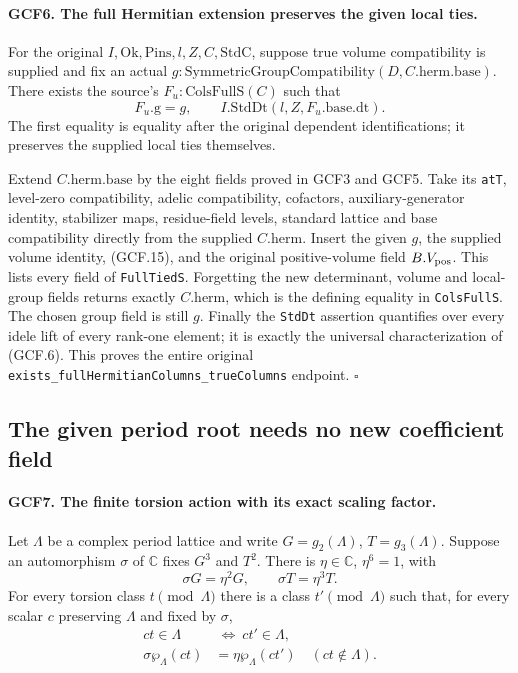 \paragraph{GCF6. The full Hermitian extension preserves the given local ties.}
\label{claim:GCF6}
For the original \(I,\mathrm{Ok},\mathrm{Pins},l,Z,C,\mathrm{StdC}\),
suppose true volume compatibility is supplied and fix an actual
\(g:\mathrm{SymmetricGroupCompatibility}(D,C.\mathrm{herm.base})\).
There exists the source's \(F_u:\mathrm{ColsFullS}(C)\) such that
\[
 F_u.\mathrm{g}=g,\qquad
 I.\mathrm{StdDt}(l,Z,F_u.\mathrm{base.dt}).             \tag{GCF.16}
\]
The first equality is equality after the original dependent
identifications; it preserves the supplied local ties themselves.

Extend \(C.\mathrm{herm.base}\) by the eight fields proved in
GCF3 and GCF5.  Take its \texttt{atT}, level-zero compatibility,
adelic compatibility, cofactors, auxiliary-generator identity,
stabilizer maps, residue-field levels, standard lattice and base
compatibility directly from the supplied \(C.\mathrm{herm}\).
Insert the given \(g\), the supplied volume identity, (GCF.15), and
the original positive-volume field \(B.V_{\rm pos}\).
This lists every field of \texttt{FullTiedS}.  Forgetting the new
determinant, volume and local-group fields returns exactly
\(C.\mathrm{herm}\), which is the defining equality in
\texttt{ColsFullS}.  The chosen group field is still \(g\).
Finally the \texttt{StdDt} assertion quantifies over every idele lift
of every rank-one element; it is exactly the universal characterization
of (GCF.6).  This proves the entire original
\texttt{exists\_fullHermitianColumns\_trueColumns} endpoint.
\hfill\(\square\)

\subsection{The given period root needs no new coefficient field}

\paragraph{GCF7. The finite torsion action with its exact scaling factor.}
\label{claim:GCF7}
Let \(\Lambda\) be a complex period lattice and write
\(G=g_2(\Lambda)\), \(T=g_3(\Lambda)\).  Suppose an automorphism
\(\sigma\) of \(\mathbb C\) fixes \(G^3\) and \(T^2\).
There is \(\eta\in\mathbb C\), \(\eta^6=1\), with
\[
 \sigma G=\eta^2G,\qquad \sigma T=\eta^3T.             \tag{GCF.17}
\]
For every torsion class \(t\pmod\Lambda\) there is a class
\(t'\pmod\Lambda\) such that, for every scalar \(c\) preserving
\(\Lambda\) and fixed by \(\sigma\),
\[
 \begin{split}
 ct\in\Lambda&\ \Longleftrightarrow\ ct'\in\Lambda,\\
 \sigma\wp_\Lambda(ct)&=\eta\wp_\Lambda(ct')
                                      \quad(ct\notin\Lambda).
 \end{split}                                                   \tag{GCF.18}
\]

